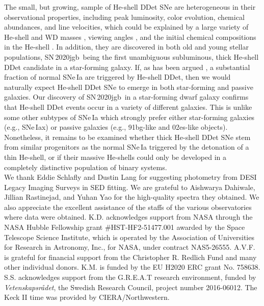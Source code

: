 \documentclass[twocolumn]{aastex631}
\newcommand{\sn}{SN\,2020jgb}
\begin{document}
The small, but growing, sample of He-shell DDet SNe are heterogeneous in their observational properties, including peak luminosity, color evolution, chemical abundances, and line velocities, which could be explained by a large variety of He-shell and WD masses \citep{polin_observational_2019,Shen_2D_2021}, viewing angles \citep{Shen_2D_2021}, and the initial chemical compositions in the He-shell \citep{Kromer_DD_2010}. In addition, they are discovered in both old and young stellar populations, \sn\ being the first unambiguous subluminous, thick He-shell DDet candidate in a star-forming galaxy. If, as has been argued \citep[e.g.,][]{Sanders_2021, Eitner_2022}, a substantial fraction of normal SNe\,Ia are triggered by He-shell DDet, then we would naturally expect He-shell DDet SNe to emerge in both star-forming and passive galaxies. Our discovery of \sn\ in a star-forming dwarf galaxy confirms that He-shell DDet events occur in a variety of different galaxies. This is unlike some other subtypes of SNe\,Ia \citep{Jha_2019} which strongly prefer either star-forming galaxies (e.g., SNe\,Iax) or passive galaxies (e.g., 91bg-like and 02es-like objects). Nonetheless, it remains to be examined whether thick He-shell DDet SNe stem from similar progenitors as the normal SNe\,Ia triggered by the detonation of a thin He-shell, or if their massive He-shells could only be developed in a completely distinctive population of binary systems.\\

\noindent We thank Eddie Schlafly and Dustin Lang for suggesting photometry from DESI Legacy Imaging Surveys in SED fitting. We are grateful to Aishwarya Dahiwale, Jillian Rastinejad, and Yuhan Yao for the high-quality spectra they obtained. We also appreciate the excellent assistance of the staffs of the various observatories where data were obtained. K.D. acknowledges support from NASA through the NASA Hubble Fellowship grant \#HST-HF2-51477.001 awarded by the Space Telescope Science Institute, which is operated by the Association of Universities for Research in Astronomy, Inc., for NASA, under contract NAS5-26555. A.V.F. is grateful for financial support from the Christopher R. Redlich Fund and many other individual donors. K.M. is funded by the EU H2020 ERC grant No. 758638. S.S. acknowledges support from the G.R.E.A.T research environment, funded by {\em Vetenskapsr\aa det}, the Swedish Research Council, project number 2016-06012. The Keck II time was provided by CIERA/Northwestern.
\end{document}

